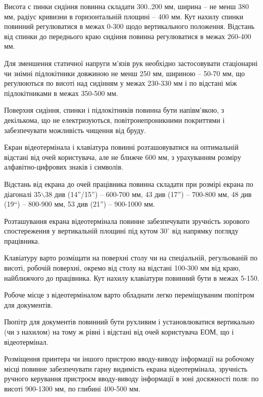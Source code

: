 \documentclass[simple,a4paper,14pt,ukrainian,utf8]{eskdtext}
\begin{document}
\begin{appendices}
                Висота с пинки сидіння повинна складати 300..200 мм, ширина -- не менш 380 мм, радіус кривизни в горизонтальній площині -- 400 мм. Кут нахилу спинки повинний регулюватися в межах 0-300 щодо вертикального положення. Відстань від спинки до переднього краю сидіння повинна регулюватися в межах 260-400 мм.

                Для зменшення статичної напруги м'язів рук необхідно застосовувати стаціонарні чи знімні підлокітники довжиною не менш 250 мм, шириною -- 50-70 мм, що регулюються по висоті над сидінням у межах 230-330 мм і по відстані між підлокітниками в межах 350-500 мм.

                Поверхня сидіння, спинки і підлокітників повинна бути напівм'якою, з декількома, що не електризуються, повітронепроникними покриттями і забезпечувати можливість чищення від бруду.

                Екран відеотермінала і клавіатура повинні розташовуватися на оптимальній відстані від очей користувача, але не ближче 600 мм, з урахуванням розміру алфавітно-цифрових знаків і символів.

                Відстань від екрана до очей працівника повинна складати при розмірі екрана по діагоналі 35\ensuremath{\backslash}38 див (14''/15'') -- 600-700 мм, 43 див (17'') -- 700-800 мм, 48 див (19{``}) -- 800-900 мм, 53 див (21'') -- 900-1000 мм.

                Розташування екрана відеотермінала повинне забезпечувати зручність зорового спостереження у вертикальній площині під кутом $30^{\circ}$ від напрямку погляду працівника.

                Клавіатуру варто розміщати на поверхні столу чи на спеціальній, регульованій по висоті, робочій поверхні, окремо від столу на відстані 100-300 мм від краю, найближчого до працівника. Кут нахилу клавіатури повинний бути в межах 5-150.

                Робоче місце з відеотерміналом варто обладнати легко переміщуваним пюпітром для документів.

                Пюпітр для документів повинний бути рухливим і установлюватися вертикально (чи з нахилом) на тому ж рівні і відстані від очей користувача ЕОМ, що і відеотермінал.

                Розміщення принтера чи іншого пристрою вводу-виводу інформації на робочому місці повинне забезпечувати гарну видимість екрана відеотермінала, зручність ручного керування пристроєм вводу-виводу інформації в зоні досяжності поля: по висоті 900-1300 мм, по глибині 400-500 мм.


\end{appendices}
\end{document}
